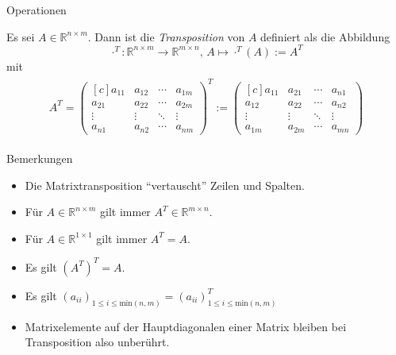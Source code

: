 \documentclass[
  8pt,
  ignorenonframetext,
]{beamer}
\providecommand{\tightlist}{%
  \setlength{\itemsep}{0pt}\setlength{\parskip}{0pt}}
\begin{document}
\begin{frame}{Operationen}
\protect\hypertarget{operationen-10}{}
\footnotesize
\begin{definition}[Matrixtransposition]
Es sei $A \in \mathbb{R}^{n\times m}$. Dann ist  die \textit{Transposition}
von $A$ definiert als die Abbildung
\begin{equation}
\cdot^{T} : \mathbb{R}^{n\times m} \to \mathbb{R}^{m \times n}, \,
A \mapsto \cdot^{T}(A) := A^T
\end{equation}
mit
\begin{align}
\begin{split}
A^T
=
\begin{pmatrix*}[c]
a_{11} & a_{12} & \cdots & a_{1m} \\
a_{21} & a_{22} & \cdots & a_{2m} \\
\vdots & \vdots & \ddots & \vdots \\
a_{n1} & a_{n2} & \cdots & a_{nm}
\end{pmatrix*}^T
:=
\begin{pmatrix*}[c]
a_{11} & a_{21} & \cdots & a_{n1} \\
a_{12} & a_{22} & \cdots & a_{n2} \\
\vdots & \vdots & \ddots & \vdots \\
a_{1m} & a_{2m} & \cdots & a_{mn}
\end{pmatrix*}
\end{split}
\end{align}
\end{definition}

Bemerkungen

\begin{itemize}
\tightlist
\item
  \justifying Die Matrixtransposition ``vertauscht'' Zeilen und Spalten.
\item
  Für \(A \in \mathbb{R}^{n \times m}\) gilt immer
  \(A^T \in \mathbb{R}^{m \times n}\).
\item
  Für \(A \in \mathbb{R}^{1 \times 1}\) gilt immer \(A^T = A\).
\item
  Es gilt \(\left(A^T\right)^T = A\).
\item
  Es gilt
  \(\left(a_{ii}\right)_{1 \le i \le \mbox{min}(n,m)} = \left(a_{ii}\right)^T_{1 \le i \le \mbox{min}(n,m)}\)
\item
  Matrixelemente auf der Hauptdiagonalen einer Matrix bleiben bei
  Transposition also unberührt.
\end{itemize}
\end{frame}
\end{document}
